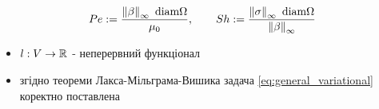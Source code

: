 \begin{frame}[allowframebreaks]
	\begin{equation}
		Pe:= \frac{\left\lVert\beta\right\rVert_\infty \text{ diam} \Omega}{\mu_0}, \qquad
		Sh:= \frac{\left\lVert\sigma\right\rVert_\infty \text{ diam} \Omega}{\left\lVert\beta\right\rVert_\infty}
	\end{equation}

	\begin{itemize}
		\item $l : V \to \mathbb{R}$ - неперервний функціонал
		\item згідно теореми Лакса-Мільграма-Вишика задача \eqref{eq:general_variational} коректно поставлена
	\end{itemize}
\end{frame}

\undeff{\vonenorm}
